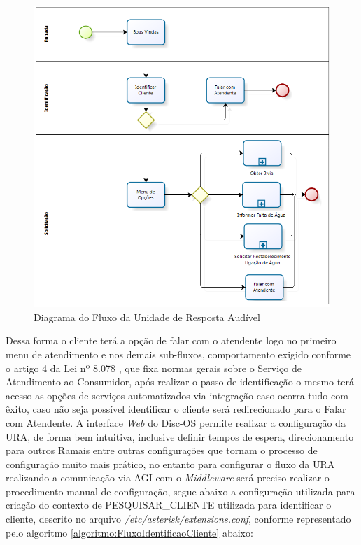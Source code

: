 \begin{figure}[!htb]
	\centering
	\caption{Diagrama do Fluxo da Unidade de Resposta Audível}
	\label{figura:fluxoURA}	
	\includegraphics{figuras/fluxo_ura.png}
\end{figure}


Dessa forma o cliente terá a opção de falar com o atendente logo no primeiro menu de atendimento e nos demais sub-fluxos, comportamento exigido conforme o artigo 4 da Lei nº 8.078 \cite{leiAtendimentoAoConsumidor}, que fixa normas gerais sobre o Serviço de Atendimento ao Consumidor, após realizar o passo de identificação o mesmo terá acesso as opções de serviços automatizados via integração caso ocorra tudo com êxito, caso não seja possível identificar o cliente será redirecionado para o Falar com Atendente.
A interface \textit{Web} do Disc-OS permite realizar a configuração da URA, de forma bem intuitiva, inclusive definir tempos de espera, direcionamento para outros Ramais entre outras configurações que tornam o processo de configuração muito mais prático, no entanto para configurar o fluxo da URA realizando a comunicação via AGI com o \textit{Middleware} será preciso realizar o procedimento manual de configuração, segue abaixo a configuração utilizada para criação do contexto de PESQUISAR\_CLIENTE utilizada para identificar o cliente, descrito no arquivo \textit{/etc/asterisk/extensions.conf}, conforme representado pelo algoritmo \ref{algoritmo:FluxoIdentificaoCliente} abaixo:


